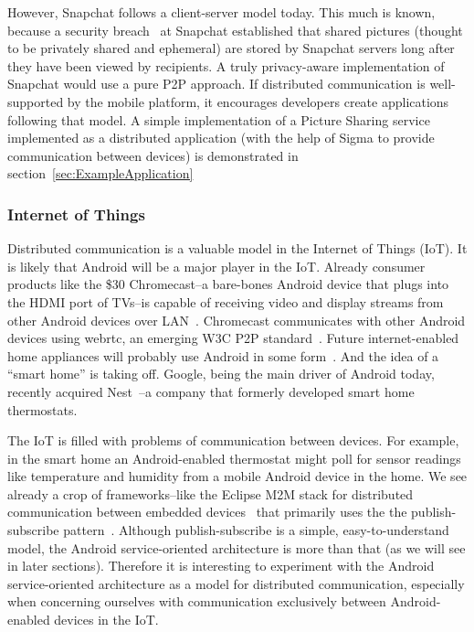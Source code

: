 \documentclass[prodmode]{acmlarge}
\begin{document}
However, Snapchat follows a client-server model today. This much is known, because a security breach~\cite{SnapchatHack} at Snapchat established that shared pictures (thought to be privately shared and ephemeral) are stored by Snapchat servers long after they have been viewed by recipients. A truly privacy-aware implementation of Snapchat would use a pure P2P approach. If distributed communication is well-supported by the mobile platform, it encourages developers create applications following that model. A simple implementation of a Picture Sharing service implemented as a distributed application (with the help of Sigma to provide communication between devices) is demonstrated in section~\ref{sec:ExampleApplication}

\subsubsection{Internet of Things}
Distributed communication is a valuable model in the Internet of Things (IoT). It is likely that Android will be a major player in the IoT. Already consumer products like the \$30 Chromecast--a bare-bones Android device that plugs into the HDMI port of TVs--is capable of receiving video and display streams from other Android devices over LAN~\cite{chromecast}. Chromecast communicates with other Android devices using webrtc, an emerging W3C P2P standard~\cite{ChromecastWebrtc}. Future internet-enabled home appliances will probably use Android in some form~\cite{AndroidEverywhere}. And the idea of a ``smart home'' is taking off. Google, being the main driver of Android today, recently acquired Nest~\cite{GoogleNest}--a company that formerly developed smart home thermostats.

The IoT is filled with problems of communication between devices. For example, in the smart home an Android-enabled thermostat might poll for sensor readings like temperature and humidity from a mobile Android device in the home. We see already a crop of frameworks--like the Eclipse M2M stack for distributed communication between embedded devices~\cite{eclipse_m2m} that primarily uses the the publish-subscribe pattern~\cite{PublishSubscribe}. Although publish-subscribe is a simple, easy-to-understand model, the Android service-oriented architecture is more than that (as we will see in later sections). Therefore it is interesting to experiment with the Android service-oriented architecture as a model for distributed communication, especially when concerning ourselves with communication exclusively between Android-enabled devices in the IoT.
\end{document}
